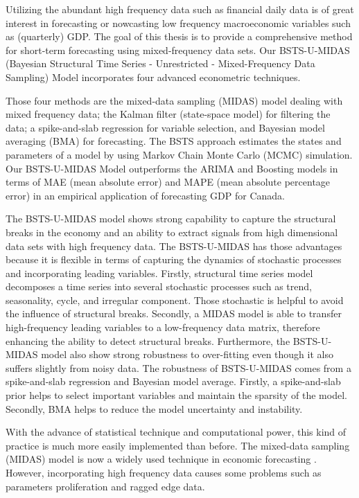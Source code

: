 \label{chapter:introduction}


Utilizing the abundant high frequency data such as financial daily data is of great interest in forecasting or nowcasting low frequency macroeconomic variables such as (quarterly) GDP.  The goal of this thesis is to provide a comprehensive method for short-term forecasting using mixed-frequency data sets. Our BSTS-U-MIDAS (Bayesian Structural Time Series - Unrestricted - Mixed-Frequency Data Sampling) Model incorporates four advanced econometric techniques. 

Those four methods are the mixed-data sampling (MIDAS) model dealing with mixed frequency data; the Kalman filter (state-space model) for filtering the data; a spike-and-slab regression for variable selection, and Bayesian model averaging (BMA) for forecasting. The BSTS approach estimates the states and parameters of a model by using Markov Chain Monte Carlo (MCMC) simulation. Our BSTS-U-MIDAS Model outperforms the ARIMA and Boosting models in terms of  MAE (mean absolute error) and MAPE (mean absolute percentage error) in an empirical application of forecasting GDP for Canada. 

The BSTS-U-MIDAS model shows strong capability to capture the structural breaks in the economy and an ability to extract signals from high dimensional data sets with high frequency data. The BSTS-U-MIDAS has those advantages because it is flexible in terms of capturing the dynamics of stochastic processes and incorporating leading variables. Firstly, structural time series model decomposes a time series into several stochastic processes such as trend, seasonality, cycle, and irregular component. Those stochastic is helpful to avoid the influence of structural breaks.  Secondly, a MIDAS model is able to transfer high-frequency leading variables to a low-frequency  data matrix, therefore enhancing the ability to detect structural breaks.  Furthermore, the BSTS-U-MIDAS model also show strong robustness to over-fitting even though it also suffers slightly from noisy data. The robustness of BSTS-U-MIDAS comes from a spike-and-slab regression and Bayesian model average. Firstly, a spike-and-slab prior helps to select important variables and maintain the sparsity of the model. Secondly, BMA helps to reduce the model uncertainty and instability.



With the advance of statistical technique and computational power, this kind of practice is much more easily implemented than before. The mixed-data sampling (MIDAS) model is now a widely used technique in economic forecasting \cite{Ghysels2007}. However, incorporating high frequency data causes some problems such as parameters proliferation and ragged edge data.  

